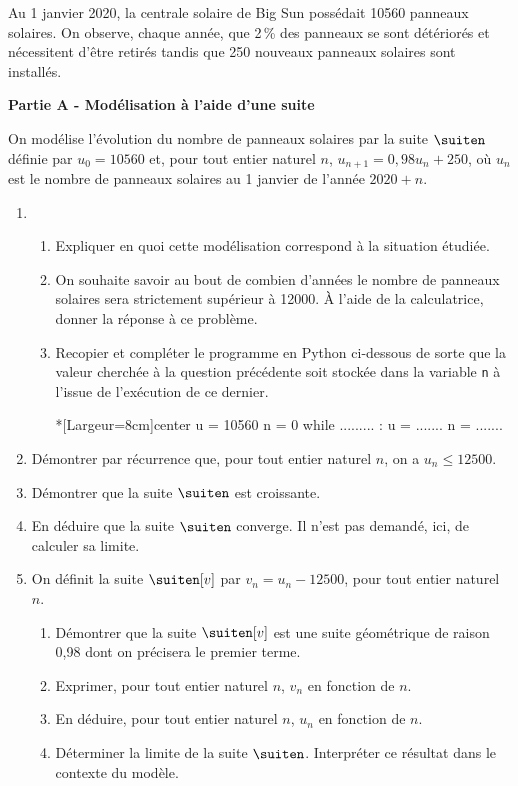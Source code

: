 Au 1 janvier 2020, la centrale solaire de Big Sun possédait \num{10560} panneaux solaires. On observe, chaque année, que 2\,\% des panneaux se sont détériorés et nécessitent d’être retirés tandis que 250 nouveaux panneaux solaires sont installés.

\medskip

\textbf{Partie A - Modélisation à l’aide d’une suite}

\medskip

On modélise l’évolution du nombre de panneaux solaires par la suite $\suiten$ définie par $u_0=\num{10560}$ et, pour tout entier naturel $n$, $u_{n+1}=0,98u_n+250$, où $u_n$ est le nombre de panneaux solaires au 1 janvier de l’année $2020+n$.

\begin{enumerate}
	\item 
	\begin{enumerate}
		\item Expliquer en quoi cette modélisation correspond à la situation étudiée.
		\item On souhaite savoir au bout de combien d’années le nombre de panneaux solaires sera strictement supérieur à \num{12000}. À l’aide de la calculatrice, donner la réponse à ce problème.
		\item Recopier et compléter le programme en \textsf{Python} ci-dessous de sorte que la valeur cherchée à la question précédente soit stockée dans la variable \texttt{n} à l’issue de l’exécution de ce dernier.
\begin{CodePythonLstAlt}*[Largeur=8cm]{center}
u = 10560
n = 0
while ......... :
	u = .......
	n = .......
\end{CodePythonLstAlt}
	\end{enumerate}
	\item Démontrer par récurrence que, pour tout entier naturel $n$, on a $u_n \leqslant \num{12500}$.
	\item Démontrer que la suite $\suiten$ est croissante.
	\item En déduire que la suite $\suiten$ converge. Il n’est pas demandé, ici, de calculer sa limite.
	\item On définit la suite $\suiten[v]$ par $v_n=u_n-\num{12500}$, pour tout entier naturel $n$.
	\begin{enumerate}
		\item Démontrer que la suite $\suiten[v]$ est une suite géométrique de raison 0,98 dont on précisera le premier terme.
		\item Exprimer, pour tout entier naturel $n$, $v_n$ en fonction de $n$.
		\item En déduire, pour tout entier naturel $n$, $u_n$ en fonction de $n$.
		\item Déterminer la limite de la suite $\suiten$. Interpréter ce résultat dans le contexte du modèle.
	\end{enumerate}
\end{enumerate}


